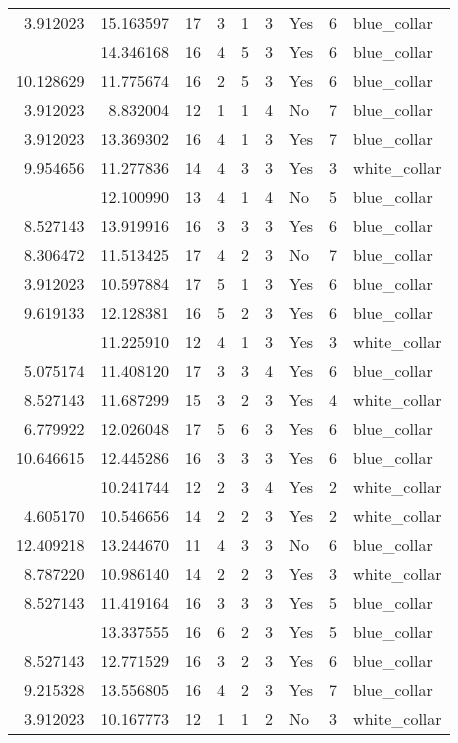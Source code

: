 \documentclass[
]{article}
\begin{document}
\begin{longtable}[t]{rrrrrllrl}
3.912023 & 15.163597 & 17 & 3 & 1 & 3 & Yes & 6 & blue\_collar\\
\addlinespace
10.597884 & 14.346168 & 16 & 4 & 5 & 3 & Yes & 6 & blue\_collar\\
10.128629 & 11.775674 & 16 & 2 & 5 & 3 & Yes & 6 & blue\_collar\\
3.912023 & 8.832004 & 12 & 1 & 1 & 4 & No & 7 & blue\_collar\\
3.912023 & 13.369302 & 16 & 4 & 1 & 3 & Yes & 7 & blue\_collar\\
9.954656 & 11.277836 & 14 & 4 & 3 & 3 & Yes & 3 & white\_collar\\
\addlinespace
3.912023 & 12.100990 & 13 & 4 & 1 & 4 & No & 5 & blue\_collar\\
8.527143 & 13.919916 & 16 & 3 & 3 & 3 & Yes & 6 & blue\_collar\\
8.306472 & 11.513425 & 17 & 4 & 2 & 3 & No & 7 & blue\_collar\\
3.912023 & 10.597884 & 17 & 5 & 1 & 3 & Yes & 6 & blue\_collar\\
9.619133 & 12.128381 & 16 & 5 & 2 & 3 & Yes & 6 & blue\_collar\\
\addlinespace
3.912023 & 11.225910 & 12 & 4 & 1 & 3 & Yes & 3 & white\_collar\\
5.075174 & 11.408120 & 17 & 3 & 3 & 4 & Yes & 6 & blue\_collar\\
8.527143 & 11.687299 & 15 & 3 & 2 & 3 & Yes & 4 & white\_collar\\
6.779922 & 12.026048 & 17 & 5 & 6 & 3 & Yes & 6 & blue\_collar\\
10.646615 & 12.445286 & 16 & 3 & 3 & 3 & Yes & 6 & blue\_collar\\
\addlinespace
5.075174 & 10.241744 & 12 & 2 & 3 & 4 & Yes & 2 & white\_collar\\
4.605170 & 10.546656 & 14 & 2 & 2 & 3 & Yes & 2 & white\_collar\\
12.409218 & 13.244670 & 11 & 4 & 3 & 3 & No & 6 & blue\_collar\\
8.787220 & 10.986140 & 14 & 2 & 2 & 3 & Yes & 3 & white\_collar\\
8.527143 & 11.419164 & 16 & 3 & 3 & 3 & Yes & 5 & blue\_collar\\
\addlinespace
10.878990 & 13.337555 & 16 & 6 & 2 & 3 & Yes & 5 & blue\_collar\\
8.527143 & 12.771529 & 16 & 3 & 2 & 3 & Yes & 6 & blue\_collar\\
9.215328 & 13.556805 & 16 & 4 & 2 & 3 & Yes & 7 & blue\_collar\\
3.912023 & 10.167773 & 12 & 1 & 1 & 2 & No & 3 & white\_collar\\

\end{longtable}
\end{document}
